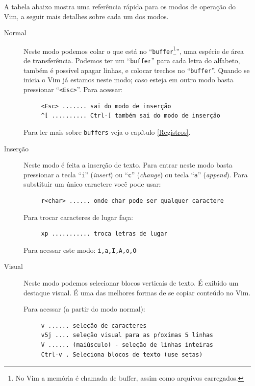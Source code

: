 \documentclass[10pt,a4paper,openany]{book}
\begin{document}
A tabela abaixo mostra uma referência rápida para os modos de operação do Vim,
a seguir mais detalhes sobre cada um dos modos.

\begin{description}

\item [Normal] Neste modo podemos colar o que está no
 ``\verb|buffer|\footnote{No Vim a memória é chamada de buffer, assim como
 arquivos carregados.}'', uma espécie de área de transferência. Podemos ter um
 ``\verb|buffer|'' para cada letra do alfabeto, também é possível apagar linhas, e
 colocar trechos no ``\verb|buffer|''. Quando se inicia o Vim já estamos neste modo;
 caso esteja em outro modo basta pressionar ``\verb|<Esc>|''.  Para acessar:

\begin{verbatim}
     <Esc> ....... sai do modo de inserção
     ^[ .......... Ctrl-[ também sai do modo de inserção
\end{verbatim}

Para ler mais sobre \verb|buffers| veja o capítulo \ref{Registros}.

\item [Inserção]
Neste modo é feita a inserção de texto. Para entrar neste modo basta
pressionar a tecla ``\verb|i|'' ({\em insert}) ou ``\verb|c|'' ({\em change})
ou tecla ``\verb|a|'' ({\em append}).  Para substituir um único caractere você
pode usar:

\begin{verbatim}
     r<char> ...... onde char pode ser qualquer caractere
\end{verbatim}

Para trocar caracteres de lugar faça:

\begin{verbatim}
     xp ........... troca letras de lugar
\end{verbatim}


Para acessar este modo:  \verb+i,a,I,A,o,O+

\item [Visual] Neste modo podemos selecionar blocos verticais de texto. É
exibido um destaque visual. É uma das melhores formas de se copiar
conteúdo no Vim.

Para acessar (a partir do modo normal):

\begin{verbatim}
     v ...... seleção de caracteres
     v5j .... seleção visual para as pŕoximas 5 linhas
     V ...... (maiúsculo) - seleção de linhas inteiras
     Ctrl-v . Seleciona blocos de texto (use setas)
\end{verbatim}


\end{description}
\end{document}
